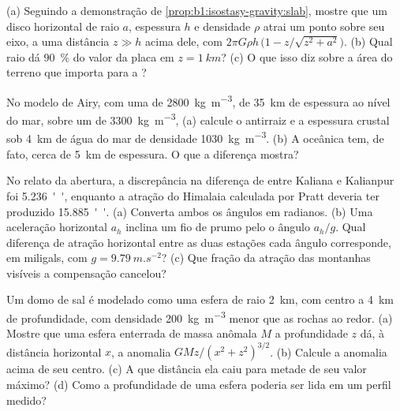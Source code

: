 \begin{exercise}[$\star\star$]\label{exo:b1:isostasy-gravity:7}
(a) Seguindo a demonstração de \cref{prop:b1:isostasy-gravity:slab}, mostre que um disco horizontal de raio $a$, espessura $h$ e densidade $\rho$ atrai um ponto
sobre seu eixo, a uma distância $z \gg h$ acima dele, com $2\pi G\rho h\,\bigl(1 -
z/\sqrt{z^2 + a^2}\bigr)$. (b) Qual raio dá \qty{90}{\percent} do valor da placa
em $z = \qty{1}{km}$? (c) O que isso diz sobre a área do terreno que importa para a ?
\end{exercise}

\begin{exercise}[$\star\star$]\label{exo:b1:isostasy-gravity:8}
No modelo de Airy, com uma  de \qty{2800}{kg.m^{-3}}, de \qty{35}{km} de espessura ao nível do mar,
sobre um  de \qty{3300}{kg.m^{-3}}, (a) calcule o antirraiz e a espessura crustal
sob \qty{4}{km} de água do mar de densidade \qty{1030}{kg.m^{-3}}.
(b) A  oceânica tem, de fato, cerca de \qty{5}{km} de espessura. O que a
diferença mostra? %
\end{exercise}

\begin{exercise}[$\star\star$]\label{exo:b1:isostasy-gravity:9}
No relato da abertura, a discrepância na diferença de  entre Kaliana e Kalianpur foi \qty{5.236}{''}, enquanto a atração do
Himalaia calculada por Pratt deveria ter produzido \qty{15.885}{''}. (a) Converta ambos os ângulos em radianos. (b) Uma aceleração horizontal $a_h$ inclina um fio de prumo pelo
o ângulo $a_h/g$. Qual diferença de atração horizontal entre as duas estações cada ângulo
corresponde, em miligals, com $g = \qty{9.79}{m.s^{-2}}$? (c) Que fração da atração das
montanhas visíveis a compensação cancelou?
\end{exercise}

\begin{exercise}[$\star\star\star$]\label{exo:b1:isostasy-gravity:10}
Um domo de sal é modelado como uma esfera de raio \qty{2}{km}, com centro a
\qty{4}{km} de profundidade, com densidade \qty{200}{kg.m^{-3}} menor que as rochas
ao redor. (a) Mostre que uma esfera enterrada de massa anômala $M$ a profundidade $z$
dá, à distância horizontal $x$, a anomalia $GMz/(x^2 + z^2)^{3/2}$.
(b) Calcule a anomalia acima de seu centro. (c) A que distância ela caiu para metade de seu valor máximo?
(d) Como a profundidade de uma esfera poderia ser lida em um perfil medido?
\end{exercise}

